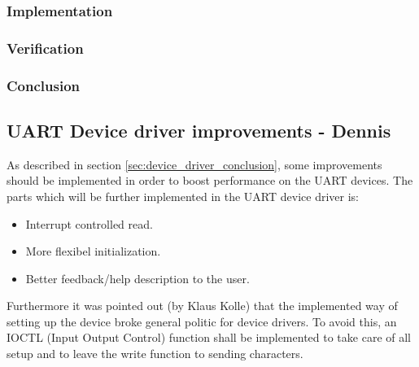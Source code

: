 \subsubsection{Implementation}
%
%
\subsubsection{Verification}
%
\subsubsection{Conclusion}
\subsection{UART Device driver improvements - Dennis}
As described in section \ref{sec:device_driver_conclusion}, some improvements should be implemented in order to boost performance on the UART devices. The parts which will be further implemented in the UART device driver is:
\begin{itemize}
	\item Interrupt controlled read.
	\item More flexibel initialization. 
	\item Better feedback/help description to the user. 
\end{itemize}
Furthermore it was pointed out (by Klaus Kolle) that the implemented way of setting up the device broke general politic for device drivers. To avoid this, an IOCTL (Input Output Control) function shall be implemented to take care of all setup and to leave the write function to sending characters. 
%
%
%
